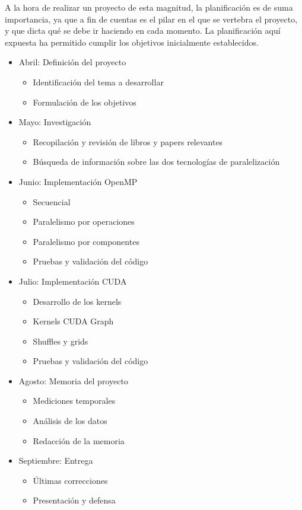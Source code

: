 A la hora de realizar un proyecto de esta magnitud, la planificación es de suma importancia, ya que a fin de cuentas es el pilar en el que se vertebra el proyecto, y que dicta qué se debe ir haciendo en cada momento. La planificación aquí expuesta ha permitido cumplir los objetivos inicialmente establecidos.
\begin{itemize}
	\item Abril: Definición del proyecto
	\begin{itemize}
		\item Identificación del tema a desarrollar
		\item Formulación de los objetivos
	\end{itemize}
	\item Mayo: Investigación
	\begin{itemize}
		\item Recopilación y revisión de libros y papers relevantes
		\item Búsqueda de información sobre las dos tecnologías de paralelización
	\end{itemize}
	\item Junio: Implementación OpenMP
	\begin{itemize}
		\item Secuencial
		\item Paralelismo por operaciones
		\item Paralelismo por componentes
		\item Pruebas y validación del código
	\end{itemize}
	\item Julio: Implementación CUDA
	\begin{itemize}
		\item Desarrollo de los kernels
		\item Kernels CUDA Graph
		\item Shuffles y grids
		\item Pruebas y validación del código
	\end{itemize}
	\item Agosto: Memoria del proyecto
	\begin{itemize}
		\item Mediciones temporales
		\item Análisis de los datos
		\item Redacción de la memoria
	\end{itemize}
	\item Septiembre: Entrega
	\begin{itemize}
		\item Últimas correcciones
		\item Presentación y defensa
	\end{itemize}
\end{itemize}

